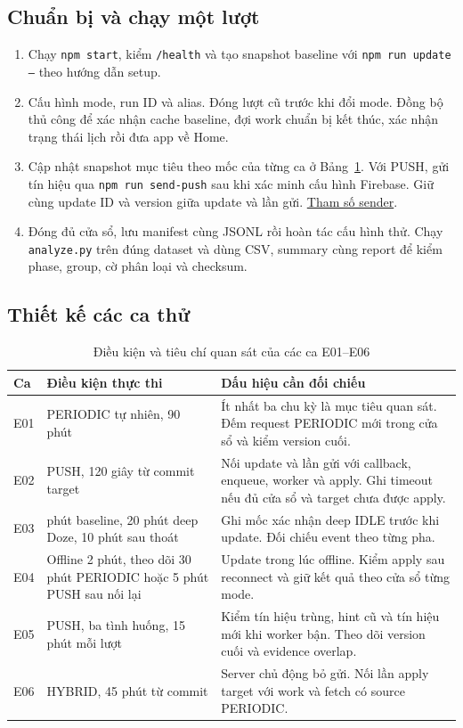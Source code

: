 \documentclass[12pt,a4paper]{report}
\newcommand{\repo}{https://github.com/ThanhTris/Seminar-IE307/blob/db8dc5f}
\newcommand{\source}[2]{\href{\repo/#1}{#2}}
\begin{document}
\subsection{Chuẩn bị và chạy một lượt}
\begin{enumerate}
  \item Chạy \texttt{npm start}, kiểm \texttt{/health} và tạo snapshot baseline với \texttt{npm run update --} theo hướng dẫn setup.
  \item Cấu hình mode, run ID và alias. Đóng lượt cũ trước khi đổi mode. Đồng bộ thủ công để xác nhận cache baseline, đợi work chuẩn bị kết thúc, xác nhận trạng thái lịch rồi đưa app về Home.
  \item Cập nhật snapshot mục tiêu theo mốc của từng ca ở Bảng~\ref{tab:protocol}. Với PUSH, gửi tín hiệu qua \texttt{npm run send-push} sau khi xác minh cấu hình Firebase. Giữ cùng update ID và version giữa update và lần gửi. \source{docs/setup/FCM_SENDER.md}{Tham số sender}.
  \item Đóng đủ cửa sổ, lưu manifest cùng JSONL rồi hoàn tác cấu hình thử. Chạy \texttt{analyze.py} trên đúng dataset và dùng CSV, summary cùng report để kiểm phase, group, cờ phân loại và checksum.
\end{enumerate}

\subsection{Thiết kế các ca thử}
\begin{table}[htbp]
\centering
\small
\caption{Điều kiện và tiêu chí quan sát của các ca E01–E06}
\label{tab:protocol}
\begin{tabularx}{\textwidth}{@{}l>{\raggedright\arraybackslash}p{4.5cm}>{\raggedright\arraybackslash}X@{}}
\toprule
Ca & Điều kiện thực thi & Dấu hiệu cần đối chiếu \\
\midrule
E01 & PERIODIC tự nhiên, 90 phút & Ít nhất ba chu kỳ là mục tiêu quan sát. Đếm request PERIODIC mới trong cửa sổ và kiểm version cuối. \\
E02 & PUSH, 120 giây từ commit target & Nối update và lần gửi với callback, enqueue, worker và apply. Ghi timeout nếu đủ cửa sổ và target chưa được apply. \\
E03 & 5 phút baseline, 20 phút deep Doze, 10 phút sau thoát & Ghi mốc xác nhận deep IDLE trước khi update. Đối chiếu event theo từng pha. \\
E04 & Offline 2 phút, theo dõi 30 phút PERIODIC hoặc 5 phút PUSH sau nối lại & Update trong lúc offline. Kiểm apply sau reconnect và giữ kết quả theo cửa sổ từng mode. \\
E05 & PUSH, ba tình huống, 15 phút mỗi lượt & Kiểm tín hiệu trùng, hint cũ và tín hiệu mới khi worker bận. Theo dõi version cuối và evidence overlap. \\
E06 & HYBRID, 45 phút từ commit & Server chủ động bỏ gửi. Nối lần apply target với work và fetch có source PERIODIC. \\
\bottomrule
\end{tabularx}
\end{table}
\end{document}
